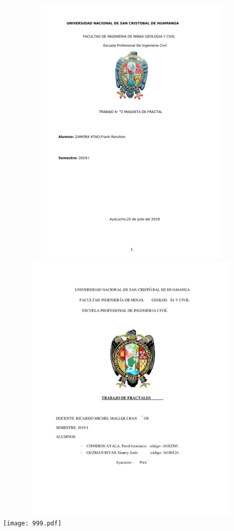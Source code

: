 \documentclass[12pt,]{report}
\begin{document}
\includegraphics[width=1\textwidth,height=5.20833in]{777.pdf}
\includegraphics[width=1\textwidth,height=5.20833in]{888.pdf}
\texttt{[image: 999.pdf]}
\end{document}
